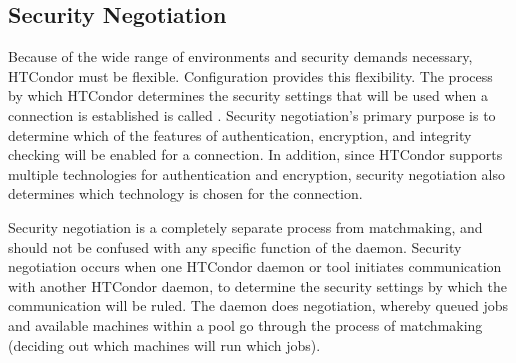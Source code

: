 \subsection{\label{sec:Security-Negotiation}Security Negotiation}

Because of the wide range of environments and security demands necessary,
HTCondor must be flexible.
Configuration provides this flexibility.
The process by which HTCondor determines the security settings that will
be used when a connection is established is called
.
Security negotiation's primary purpose is to determine which
of the features of authentication, encryption, and integrity checking
will be enabled for a connection.
In addition, since HTCondor supports multiple
technologies for authentication and encryption,
security negotiation also
determines which technology is chosen for the connection.


Security negotiation is a completely separate process from
matchmaking, and should not be confused with any specific function of
the  daemon. 
Security negotiation occurs when one
HTCondor daemon or tool initiates communication with another HTCondor daemon,
to determine the security settings by which the communication will
be ruled.
The  daemon does negotiation,
whereby queued jobs and available machines within a pool
go through the process of matchmaking (deciding out which
machines will run which jobs).

